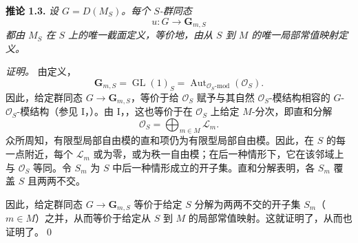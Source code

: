 \medskip
\noindent{}\textbf{推论 1.3.}
\textit{设 \(G=D(M_S)\)。每个 \(S\)-群同态}
\[
  u:G\longrightarrow\mathbf G_{m,S}
\]
\textit{都由 \(M_S\) 在 \(S\) 上的唯一截面定义，等价地，由从 \(S\) 到 \(M\) 的唯一局部常值映射定义。}

\emph{证明。}
由定义，
\[
  \mathbf G_{m,S}
  =\operatorname{GL}(1)_S
  =\operatorname{Aut}_{\mathscr O_S\text{-}\mathrm{mod}}(\mathscr O_S).
\]
因此，给定群同态 \(G\to\mathbf G_{m,S}\)，等价于给 \(\mathscr O_S\) 赋予与其自然 \(\mathscr O_S\)-模结构相容的 \(G\)-\(\mathscr O_S\)-模结构（参见 I，）。由 I，，这也等价于在 \(\mathscr O_S\) 上给定 \(M\)-分次，即直和分解
\[
  \mathscr O_S=\bigoplus_{m\in M}\mathscr L_m.
\]
众所周知，有限型局部自由模的直和项仍为有限型局部自由模。因此，在 \(S\) 的每一点附近，每个 \(\mathscr L_m\) 或为零，或为秩一自由模；在后一种情形下，它在该邻域上与 \(\mathscr O_S\) 等同。令 \(S_m\) 为 \(S\) 中后一种情形成立的开子集。直和分解表明，各 \(S_m\) 覆盖 \(S\) 且两两不交。

因此，给定群同态 \(G\to\mathbf G_{m,S}\) 等价于给定 \(S\) 分解为两两不交的开子集 \(S_m\)（\(m\in M\)）之并，从而等价于给定从 \(S\) 到 \(M\) 的局部常值映射。这就证明了，从而也证明了。\qed
